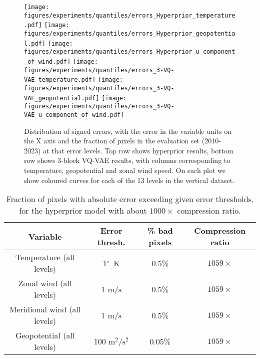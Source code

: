 \documentclass[11pt, a4paper, logo, copyright, numbering]{googledeepmind}
\begin{document}
\begin{figure}[t]
    \centering
    \texttt{[image: figures/experiments/quantiles/errors\_Hyperprior\_temperature.pdf]}
    \texttt{[image: figures/experiments/quantiles/errors\_Hyperprior\_geopotential.pdf]}
    \texttt{[image: figures/experiments/quantiles/errors\_Hyperprior\_u\_component\_of\_wind.pdf]}
    \texttt{[image: figures/experiments/quantiles/errors\_3-VQ-VAE\_temperature.pdf]}
    \texttt{[image: figures/experiments/quantiles/errors\_3-VQ-VAE\_geopotential.pdf]}
    \texttt{[image: figures/experiments/quantiles/errors\_3-VQ-VAE\_u\_component\_of\_wind.pdf]}
    \caption{Distribution of signed errors, with the error in the variable units on the X axis and the fraction of pixels in the evaluation set (2010-2023) at that error levels. Top row shows hyperprior results, bottom row shows 3-block VQ-VAE results, with columns corresponding to temperature, geopotential and zonal wind speed. On each plot we show coloured curves for each of the 13 levels in the vertical dataset.}
    \label{fig:error_histograms}
\end{figure}

\begin{table}[]
    \centering
    \caption{Fraction of pixels with absolute error exceeding given error thresholds, for the hyperprior model with about $1000 \times$ compression ratio.}
    \begin{tabular}{c|c|c|c}
        Variable & Error thresh. &\% bad pixels & Compression ratio \\
        \hline
Temperature (all levels) & 1$^\circ$~K & 0.5\% & $1059 \times$ \\
        Zonal wind (all levels) & 1 $\text{m}/\text{s}$ & 0.5\% & $1059 \times$ \\
        Meridional wind (all levels) & 1 $\text{m}/\text{s}$ & 0.5\% & $1059 \times$ \\
        Geopotential (all levels) & 100 $\text{m}^2/\text{s}^2$ & 0.05\% & $1059 \times$ \\
    \end{tabular}
    
    \label{tab:percent_bad_pixels_hyper}
\end{table}
\end{document}

